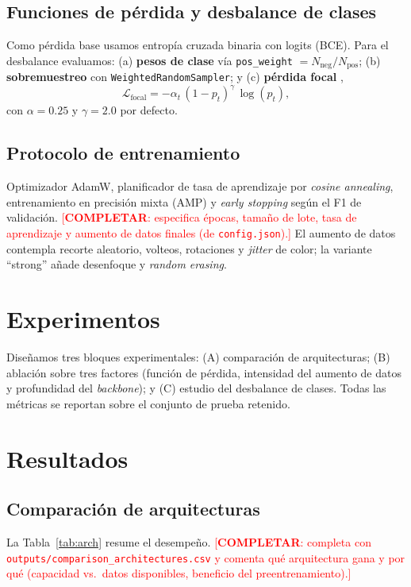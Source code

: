 \documentclass{article}
\newcommand{\TODO}[1]{\textcolor{red}{[\textbf{COMPLETAR}: #1]}}
\begin{document}
\subsection{Funciones de pérdida y desbalance de clases}
Como pérdida base usamos entropía cruzada binaria con logits (BCE). Para el desbalance
evaluamos: (a) \textbf{pesos de clase} vía \texttt{pos\_weight} $= N_{\text{neg}}/N_{\text{pos}}$;
(b) \textbf{sobremuestreo} con \texttt{WeightedRandomSampler}; y (c) \textbf{pérdida focal}
\cite{lin2017focal},
\begin{equation}
\mathcal{L}_{\text{focal}} = -\alpha_t\,(1-p_t)^{\gamma}\,\log(p_t),
\end{equation}
con $\alpha=0.25$ y $\gamma=2.0$ por defecto.

\subsection{Protocolo de entrenamiento}
Optimizador AdamW, planificador de tasa de aprendizaje por \emph{cosine annealing},
entrenamiento en precisión mixta (AMP) y \emph{early stopping} según el F1 de
validación. \TODO{especifica épocas, tamaño de lote, tasa de aprendizaje y aumento de
datos finales (de \texttt{config.json}).} El aumento de datos contempla recorte
aleatorio, volteos, rotaciones y \emph{jitter} de color; la variante ``strong'' añade
desenfoque y \emph{random erasing}.

\section{Experimentos}
Diseñamos tres bloques experimentales: (A) comparación de arquitecturas;
(B) ablación sobre tres factores (función de pérdida, intensidad del aumento de datos
y profundidad del \emph{backbone}); y (C) estudio del desbalance de clases. Todas las
métricas se reportan sobre el conjunto de prueba retenido.

\section{Resultados}
\subsection{Comparación de arquitecturas}
La Tabla~\ref{tab:arch} resume el desempeño. \TODO{completa con
\texttt{outputs/comparison\_architectures.csv} y comenta qué arquitectura gana y por
qué (capacidad vs.\ datos disponibles, beneficio del preentrenamiento).}
\end{document}
